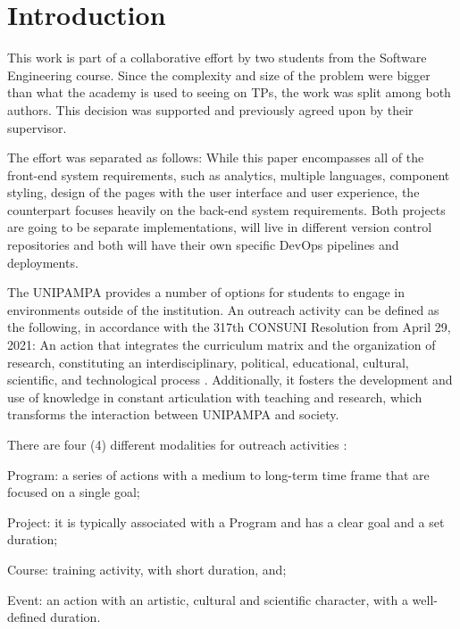 \chapter{Introduction}\label{introduction}

This work is part of a collaborative effort by two students from the Software Engineering course. Since the complexity and size of the problem were bigger than what the academy is used to seeing on \acp{TP}, the work was split among both authors. This decision was supported and previously agreed upon by their supervisor.

The effort was separated as follows: While this paper encompasses all of the front-end system requirements, such as analytics, multiple languages, component styling, design of the pages with the user interface and user experience, the counterpart focuses heavily on the back-end system requirements. Both projects are going to be separate implementations, will live in different version control repositories and both will have their own specific DevOps pipelines and deployments.

The \acl{UNIPAMPA} provides a number of options for students to engage in environments outside of the institution. An outreach activity can be defined as the following, in accordance with the 317th CONSUNI Resolution from April 29, 2021: An action that integrates the curriculum matrix and the organization of research, constituting an interdisciplinary, political, educational, cultural, scientific, and technological process . Additionally, it fosters the development and use of knowledge in constant articulation with teaching and research, which transforms the interaction between \ac{UNIPAMPA} and society.

There are four (4) different modalities for outreach activities :
\begin{inparaenum}[(i)]
  \item Program: a series of actions with a medium to long-term time frame that are focused on a single goal;
  \item Project: it is typically associated with a Program and has a clear goal and a set duration;
  \item Course: training activity, with short duration, and;
  \item Event: an action with an artistic, cultural and scientific character, with a well-defined duration.
\end{inparaenum}

